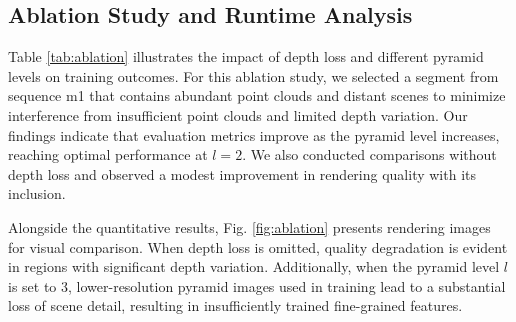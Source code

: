 \documentclass[lettersize,journal]{IEEEtran}
\begin{document}
\begin{table}
\centering
\renewcommand{\arraystretch}{1.2} %
\setlength{\tabcolsep}{4pt} %
\caption{The impact of keyframe selection and keyframe delay on performance.}
\label{tab:keyframe_comparison}
\end{table}

\subsection{Ablation Study and Runtime Analysis}

Table \ref{tab:ablation} illustrates the impact of depth loss and different pyramid levels on training outcomes. For this ablation study, we selected a segment from sequence m1 that contains abundant point clouds and distant scenes to minimize interference from insufficient point clouds and limited depth variation. Our findings indicate that evaluation metrics improve as the pyramid level increases, reaching optimal performance at $l=2$. We also conducted comparisons without depth loss and observed a modest improvement in rendering quality with its inclusion.

Alongside the quantitative results, Fig. \ref{fig:ablation} presents rendering images for visual comparison. When depth loss is omitted, quality degradation is evident in regions with significant depth variation. Additionally, when the pyramid level $l$ is set to 3, lower-resolution pyramid images used in training lead to a substantial loss of scene detail, resulting in insufficiently trained fine-grained features.
\end{document}
